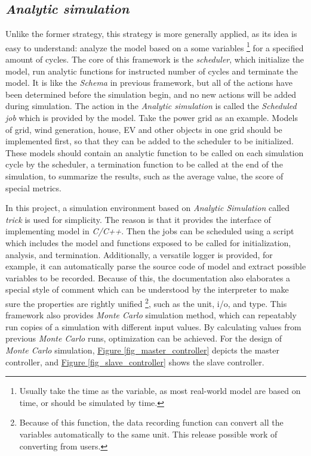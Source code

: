 \documentclass[12pt,a4paper]{report}
\begin{document}
        \subsection{\emph{Analytic simulation}}
        \label{text_nasa_trick}
        Unlike the former strategy, this strategy is more generally applied, as its idea is easy to understand: analyze the model based on a some variables \footnote{Usually take the time as the variable, as most real-world model are based on time, or should be simulated by time.} for a specified amount of cycles. The core of this framework is the \emph{scheduler}, which initialize the model, run analytic functions for instructed number of cycles and terminate the model. It is like the \emph{Schema} in previous framework, but all of the actions have been determined before the simulation begin, and no new actions will be added during simulation. The action in the \emph{Analytic simulation} is called the \emph{Scheduled job} which is provided by the model.
        Take the power grid as an example. Models of grid, wind generation, house, EV and other objects in one grid should be implemented first, so that they can be added to the scheduler to be initialized. These models should contain an analytic function to be called on each simulation cycle by the scheduler, a termination function to be called at the end of the simulation, to summarize the results, such as the average value, the score of special metrics.

        In this project, a simulation environment based on \emph{Analytic Simulation} called \emph{trick} \cite{website:trick} is used for simplicity. The reason is that it provides the interface of implementing model in \emph{C/C++}. Then the jobs can be scheduled using a script which includes the model and functions exposed to be called for initialization, analysis, and termination. Additionally, a versatile logger is provided, for example, it can automatically parse the source code of model and extract possible variables to be recorded. Because of this, the documentation also elaborates a special style of comment which can be understood by the interpreter to make sure the properties are rightly unified \footnote{Because of this function, the data recording function can convert all the variables automatically to the same unit. This release possible work of converting from users.}, such as the unit, i/o, and type. This framework also provides \emph{Monte Carlo} simulation method, which can repeatably run copies of a simulation with different input values. By calculating values from previous \emph{Monte Carlo} runs, optimization can be achieved.
        For the design of \emph{Monte Carlo} simulation, \hyperref[fig_master_controller]{Figure \ref*{fig_master_controller}} depicts the master controller, and \hyperref[fig_slave_controller]{Figure \ref*{fig_slave_controller}} shows the slave controller.
\end{document}
